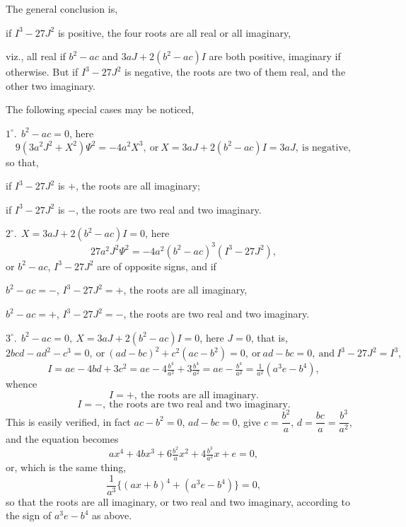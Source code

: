 \documentclass[11pt]{article}
\begin{document}
The general conclusion is,

\smallskip

if $I^{3}-27J^{2}$ is positive, the four roots are all real or all imaginary,

\smallskip

viz., all real if $b^{2}-ac$ and $3aJ+2(b^{2}-ac)I$ are both positive, imaginary if otherwise.
But if $I^{3}-27J^{2}$ is negative, the roots are two of them real, and the other two imaginary.

\smallskip

The following special cases may be noticed,

\smallskip

$1^{\circ}.\ \  b^{2}-ac=0$,
here
\[ 9(3a^{2}J^{2}+X^{2})\Psi^{2}=-4a^{2}X^{3},\ \text{or}\ X=3aJ+2(b^{2}-ac)I=3aJ,\ \text{is negative}, \]
so that,

\smallskip

\hspace{1em} if $I^{3}-27J^{2}$ is $+$, the roots are all imaginary;

\smallskip

\hspace{1em} if $I^{3}-27J^{2}$ is $-$, the roots are two real and two imaginary.

\smallskip

$2^{\circ}.\ \  X=3aJ+2(b^{2}-ac)I=0$,
here
\[ 27a^{2}J^{2}\Psi^{2}=-4a^{2}(b^{2}-ac)^{3}(I^{3}-27J^{2}), \]
or $b^{2}-ac$, $I^{3}-27J^{2}$ are of opposite signs, and if

\smallskip

\hspace{1em} $b^{2}-ac=-$, $I^{3}-27J^{2}=+$, the roots are all imaginary,

\hspace{1em} $b^{2}-ac=+$, $I^{3}-27J^{2}=-$, the roots are two real and two imaginary.

\smallskip

$3^{\circ}.\ \  b^{2}-ac=0,\ X=3aJ+2(b^{2}-ac)I=0$,
here $J=0$, that is,
\[ 2bcd-ad^{2}-c^{3}=0,\ \text{or}\ (ad-bc)^{2}+c^{2}(ac-b^{2})=0,\ \text{or}\ ad-bc=0,\ \text{and}\ I^{3}-27J^{2}=I^{3}, \]
\[ I=ae-4bd+3c^{2}=ae-4\tfrac{b^{4}}{a^{2}}+3\tfrac{b^{4}}{a^{2}}=ae-\tfrac{b^{4}}{a^{2}}=\tfrac{1}{a^{2}}(a^{3}e-b^{4}), \]
whence
\[ I=+,\ \text{the roots are all imaginary.} \]
\[ I=-,\ \text{the roots are two real and two imaginary.} \]
This is easily verified, in fact $ac-b^{2}=0$, $ad-bc=0$, give $c=\dfrac{b^{2}}{a}$, $d=\dfrac{bc}{a}=\dfrac{b^{3}}{a^{2}}$, and the
equation becomes
\[ ax^{4}+4bx^{3}+6\tfrac{b^{2}}{a}x^{2}+4\tfrac{b^{3}}{a^{2}}x+e=0, \]
or, which is the same thing,
\[ \frac{1}{a^{3}}\{(ax+b)^{4}+(a^{3}e-b^{4})\}=0, \]
so that the roots are all imaginary, or two real and two imaginary, according to the
sign of $a^{3}e-b^{4}$ as above.
\end{document}
